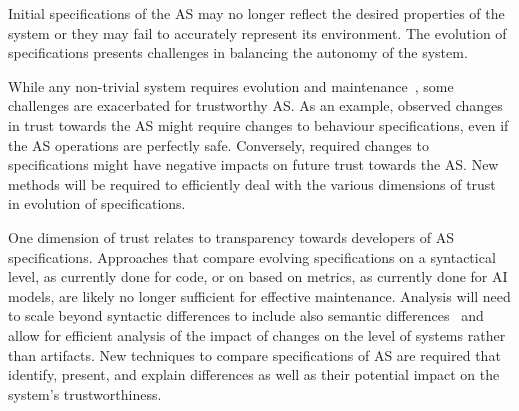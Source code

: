 \documentclass[sigconf,nonacm]{acmart}%
\begin{document}
    Initial specifications of the AS may no longer reflect the desired properties of the system or they may fail to accurately represent its environment. The evolution of specifications presents challenges in balancing the autonomy of the system.
	
    

    While any non-trivial system requires evolution and maintenance~\cite{Mens08}, some challenges are exacerbated for trustworthy AS. As an example, observed changes in trust towards the AS might require changes to behaviour specifications, even if the AS operations are perfectly safe. Conversely, required changes to specifications might have negative impacts on future trust towards the AS. New methods will be required to efficiently deal with the various dimensions of trust in evolution of specifications.

    One dimension of trust relates to transparency towards developers of AS specifications. Approaches that compare evolving specifications on a syntactical level, as currently done for code, or on based on metrics, as currently done for AI models, are likely no longer sufficient for effective maintenance. Analysis will need to scale beyond syntactic differences to include also semantic differences~\cite{MaozR18} and allow for efficient analysis of the impact of changes on the level of systems rather than artifacts. New techniques to compare specifications of AS are required that identify, present, and explain differences as well as their potential impact on the system's trustworthiness.
	
\end{document}
